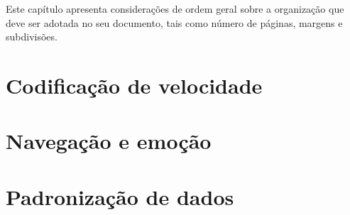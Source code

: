 
\label{Cap:ideias}

Este capítulo apresenta considerações de ordem geral sobre a
organização que deve ser adotada no seu documento, tais como número de
páginas, margens e subdivisões.

\section{Codificação de velocidade}
\label{Sec:speed_ideias}

\section{Navegação e emoção}
\label{Sec:emotion_ideias}

\section{Padronização de dados}
\label{Sec:data_ideias}

